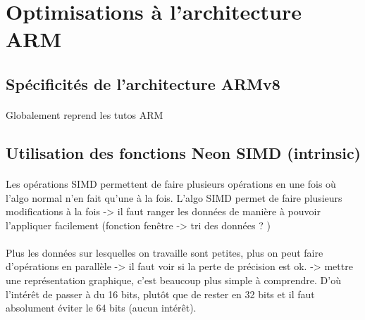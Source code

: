 \documentclass{article}
\begin{document}
    \section{Optimisations à l'architecture ARM}
    \subsection{Spécificités de l'architecture ARMv8}
    \paragraph{}
    Globalement reprend les tutos ARM

    \subsection{Utilisation des fonctions Neon SIMD (intrinsic)}

    \paragraph{}
    Les opérations SIMD permettent de faire plusieurs opérations en une fois où l'algo normal n'en fait qu'une à la fois. L'algo SIMD permet de faire plusieurs modifications à la fois -> il faut ranger les données de manière à pouvoir l'appliquer facilement (fonction fenêtre -> tri des données ? )


    \paragraph{}
    Plus les données sur lesquelles on travaille sont petites, plus on peut faire d'opérations en parallèle -> il faut voir si la perte de précision est ok. -> mettre une représentation graphique, c'est beaucoup plus simple à comprendre. D'où l'intérêt de passer à du 16 bits, plutôt que de rester en 32 bits et il faut absolument éviter le 64 bits (aucun intérêt).
\end{document}
